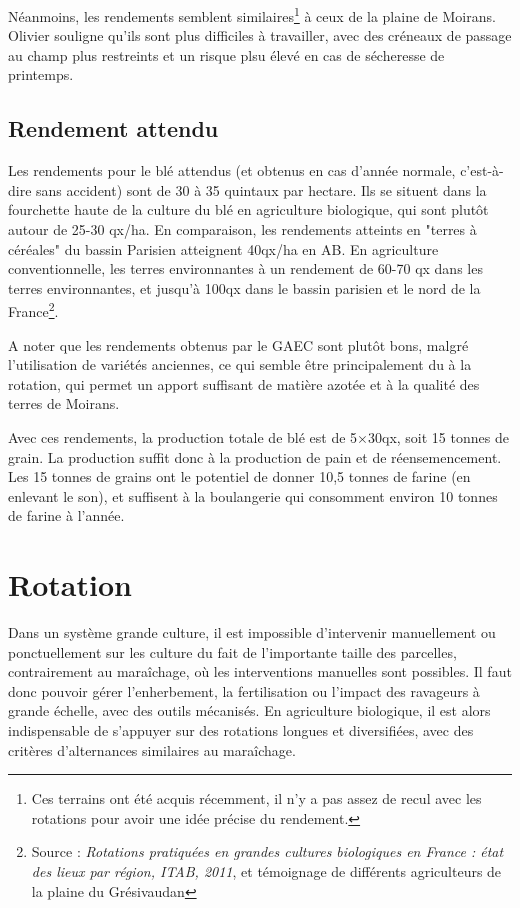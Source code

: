 \documentclass{article}
\begin{document}
Néanmoins, les rendements semblent similaires\footnote{Ces terrains ont été acquis récemment, il n'y a pas assez de recul avec les rotations pour avoir une idée précise du rendement.} à ceux de la plaine de Moirans. Olivier souligne qu'ils sont plus difficiles à travailler, avec des créneaux de passage au champ plus restreints et un risque plsu élevé en cas de sécheresse de printemps.

\subsection{Rendement attendu}

Les rendements pour le blé attendus (et obtenus en cas d'année normale, c'est-à-dire sans accident) sont de 30 à 35 quintaux par hectare. Ils se situent dans la fourchette haute de la culture du blé en agriculture biologique, qui sont plutôt autour de 25-30 qx/ha. En comparaison, les rendements atteints en "terres à céréales" du bassin Parisien atteignent 40qx/ha en AB. En agriculture conventionnelle, les terres environnantes à un rendement de 60-70 qx dans les terres environnantes, et jusqu'à 100qx dans le bassin parisien et le nord de la France\footnote{Source : \textit{Rotations pratiquées en grandes cultures biologiques en France : état des lieux par région, ITAB, 2011}, et témoignage de différents agriculteurs de la plaine du Grésivaudan}. 

A noter que les rendements obtenus par le GAEC sont plutôt bons, malgré l'utilisation de variétés anciennes, ce qui semble être principalement du à la rotation, qui permet un apport suffisant de matière azotée et à la qualité des terres de Moirans.

Avec ces rendements, la production totale de blé est de 5$\times$30qx, soit 15 tonnes de grain. La production suffit donc à la production de pain et de réensemencement. Les 15 tonnes de grains ont le potentiel de donner 10,5 tonnes de farine (en enlevant le son), et suffisent à la boulangerie qui consomment environ 10 tonnes de farine à l'année.

\section{Rotation}
\label{part:rotation}

Dans un système grande culture, il est impossible d'intervenir manuellement ou ponctuellement sur les culture du fait de l'importante taille des parcelles, contrairement au maraîchage, où les interventions manuelles sont possibles. Il faut donc pouvoir gérer l'enherbement, la fertilisation ou l'impact des ravageurs à grande échelle, avec des outils mécanisés. En agriculture biologique, il est alors indispensable de s'appuyer sur des rotations longues et diversifiées, avec des critères d'alternances similaires au maraîchage.
\end{document}
